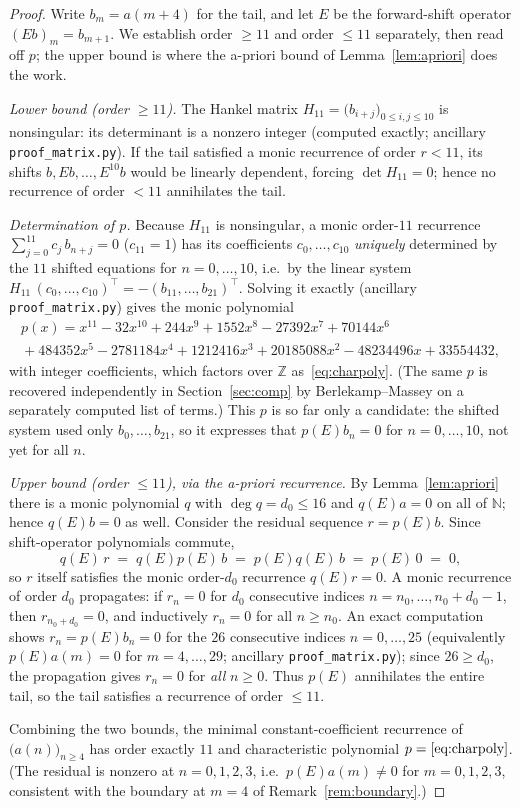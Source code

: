 \documentclass[11pt]{article}
\theoremstyle{definition}
\newcommand{\Z}{\mathbb{Z}}
\begin{document}
\begin{proof}
Write $b_m=a(m+4)$ for the tail, and let $E$ be the forward-shift operator $(Eb)_m=b_{m+1}$.
We establish order $\ge11$ and order $\le11$ separately, then read off $p$; the upper bound is
where the a-priori bound of Lemma~\ref{lem:apriori} does the work.

\emph{Lower bound (order $\ge11$).} The Hankel matrix $H_{11}=\bigl(b_{i+j}\bigr)_{0\le i,j\le
10}$ is nonsingular: its determinant is a nonzero integer (computed exactly; ancillary
\texttt{proof\_matrix.py}). If the tail satisfied a monic recurrence of order $r<11$, its
shifts $b,Eb,\dots,E^{10}b$ would be linearly dependent, forcing $\det H_{11}=0$; hence no
recurrence of order $<11$ annihilates the tail.

\emph{Determination of $p$.} Because $H_{11}$ is nonsingular, a monic order-$11$ recurrence
$\sum_{j=0}^{11}c_j\,b_{n+j}=0$ ($c_{11}=1$) has its coefficients $c_0,\dots,c_{10}$ \emph{uniquely}
determined by the $11$ shifted equations for $n=0,\dots,10$, i.e.\ by the linear system
$H_{11}\,(c_0,\dots,c_{10})^{\!\top}=-(b_{11},\dots,b_{21})^{\!\top}$. Solving it exactly
(ancillary \texttt{proof\_matrix.py}) gives the monic polynomial
\begin{multline*}
  p(x)=x^{11}-32x^{10}+244x^{9}+1552x^{8}-27392x^{7}+70144x^{6}\\
  {}+484352x^{5}-2781184x^{4}+1212416x^{3}+20185088x^{2}-48234496x+33554432,
\end{multline*}
with integer coefficients, which factors over $\Z$ as~\eqref{eq:charpoly}. (The same $p$ is
recovered independently in Section~\ref{sec:comp} by Berlekamp--Massey on a separately computed
list of terms.) This $p$ is so far only a candidate: the shifted system used only
$b_0,\dots,b_{21}$, so it expresses that $p(E)b_n=0$ for $n=0,\dots,10$, not yet for all $n$.

\emph{Upper bound (order $\le11$), via the a-priori recurrence.} By Lemma~\ref{lem:apriori}
there is a monic polynomial $q$ with $\deg q=d_0\le16$ and $q(E)a=0$ on all of $\mathbb N$;
hence $q(E)b=0$ as well. Consider the residual sequence $r=p(E)b$. Since shift-operator
polynomials commute,
\[
  q(E)\,r \;=\; q(E)p(E)\,b \;=\; p(E)q(E)\,b \;=\; p(E)\,0 \;=\;0,
\]
so $r$ itself satisfies the monic order-$d_0$ recurrence $q(E)r=0$. A monic recurrence of order
$d_0$ propagates: if $r_n=0$ for $d_0$ consecutive indices $n=n_0,\dots,n_0+d_0-1$, then
$r_{n_0+d_0}=0$, and inductively $r_n=0$ for all $n\ge n_0$. An exact computation shows
$r_n=p(E)b_n=0$ for the $26$ consecutive indices $n=0,\dots,25$ (equivalently $p(E)a(m)=0$ for
$m=4,\dots,29$; ancillary \texttt{proof\_matrix.py}); since $26\ge d_0$, the propagation gives
$r_n=0$ for \emph{all} $n\ge0$. Thus $p(E)$ annihilates the entire tail, so the tail satisfies a
recurrence of order $\le11$.

Combining the two bounds, the minimal constant-coefficient recurrence of $\bigl(a(n)\bigr)_{n\ge4}$
has order exactly $11$ and characteristic polynomial $p=\eqref{eq:charpoly}$. (The residual is
nonzero at $n=0,1,2,3$, i.e.\ $p(E)a(m)\ne0$ for $m=0,1,2,3$, consistent with the boundary at
$m=4$ of Remark~\ref{rem:boundary}.)
\end{proof}
\end{document}
